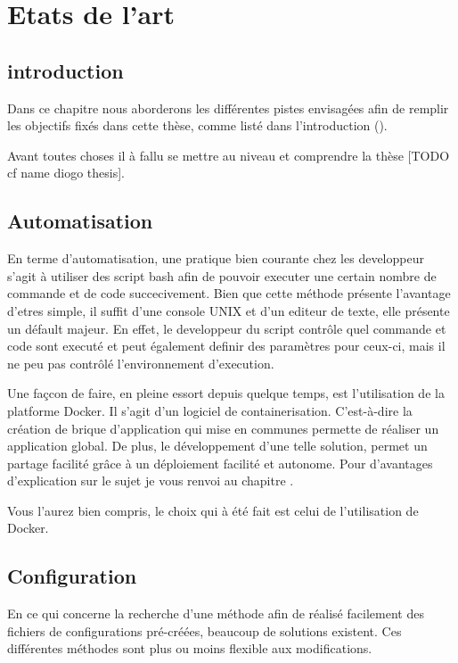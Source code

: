 \chapter{Etats de l'art}
\label{ch:state_art}

\section{introduction}
Dans ce chapitre nous aborderons les différentes pistes envisagées afin de remplir les objectifs fixés dans cette thèse, comme listé dans l'introduction ().

Avant toutes choses il à fallu se mettre au niveau et comprendre la thèse [TODO cf name diogo thesis].

\section{Automatisation}
En terme d'automatisation, une pratique bien courante chez les developpeur s'agit à utiliser des script bash afin de pouvoir executer une certain nombre de commande et de code succecivement. Bien que cette méthode présente l'avantage d'etres simple, il suffit d'une console UNIX et d'un editeur de texte, elle présente un défault majeur. En effet, le developpeur du script contrôle quel commande et code sont executé et peut également definir des paramètres pour ceux-ci, mais il ne peu pas contrôlé l'environnement d'execution.

Une façcon de faire, en pleine essort depuis quelque temps, est l'utilisation de la platforme Docker. Il s'agit d'un logiciel de containerisation. C'est-à-dire la création de brique d'application qui mise en communes permette de réaliser un application global. De plus, le développement d'une telle solution, permet un partage facilité grâce à un déploiement facilité et autonome. Pour d'avantages d'explication sur le sujet je vous renvoi au chapitre  .

Vous l'aurez bien compris, le choix qui à été fait est celui de l'utilisation de Docker.

\section{Configuration}

En ce qui concerne la recherche d'une méthode afin de réalisé facilement des fichiers de configurations pré-créées, beaucoup de solutions existent. Ces différentes méthodes sont plus ou moins flexible aux modifications.

